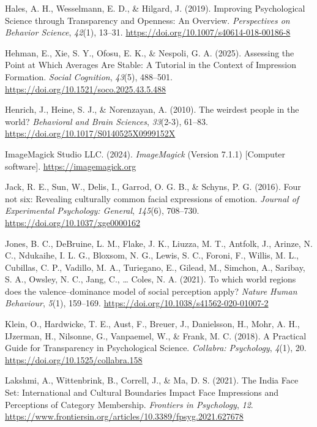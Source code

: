 \documentclass[
  letterpaper,
  DIV=11,
  numbers=noendperiod]{scrartcl}
\newlength{\cslhangindent}
\newenvironment{CSLReferences}[2] %
 {\begin{list}{}{%
  \setlength{\itemindent}{0pt}
  \setlength{\leftmargin}{0pt}
  \setlength{\parsep}{0pt}
  \ifodd #1
   \setlength{\leftmargin}{\cslhangindent}
   \setlength{\itemindent}{-1\cslhangindent}
  \fi
  \setlength{\itemsep}{#2\baselineskip}}}
 {\end{list}}
\begin{document}
\begin{CSLReferences}{1}{0}
Hales, A. H., Wesselmann, E. D., \& Hilgard, J. (2019). Improving
{Psychological} {Science} through {Transparency} and {Openness}: {An}
{Overview}. \emph{Perspectives on Behavior Science}, \emph{42}(1),
13--31. \url{https://doi.org/10.1007/s40614-018-00186-8}

Hehman, E., Xie, S. Y., Ofosu, E. K., \& Nespoli, G. A. (2025).
Assessing the {Point} at {Which} {Averages} {Are} {Stable}: {A}
{Tutorial} in the {Context} of {Impression} {Formation}. \emph{Social
Cognition}, \emph{43}(5), 488--501.
\url{https://doi.org/10.1521/soco.2025.43.5.488}

Henrich, J., Heine, S. J., \& Norenzayan, A. (2010). The weirdest people
in the world? \emph{Behavioral and Brain Sciences}, \emph{33}(2-3),
61--83. \url{https://doi.org/10.1017/S0140525X0999152X}

ImageMagick Studio LLC. (2024). \emph{ImageMagick} (Version 7.1.1)
{[}Computer software{]}. \url{https://imagemagick.org}

Jack, R. E., Sun, W., Delis, I., Garrod, O. G. B., \& Schyns, P. G.
(2016). Four not six: {Revealing} culturally common facial expressions
of emotion. \emph{Journal of Experimental Psychology: General},
\emph{145}(6), 708--730. \url{https://doi.org/10.1037/xge0000162}

Jones, B. C., DeBruine, L. M., Flake, J. K., Liuzza, M. T., Antfolk, J.,
Arinze, N. C., Ndukaihe, I. L. G., Bloxsom, N. G., Lewis, S. C., Foroni,
F., Willis, M. L., Cubillas, C. P., Vadillo, M. A., Turiegano, E.,
Gilead, M., Simchon, A., Saribay, S. A., Owsley, N. C., Jang, C.,
\ldots{} Coles, N. A. (2021). To which world regions does the
valence--dominance model of social perception apply? \emph{Nature Human
Behaviour}, \emph{5}(1), 159--169.
\url{https://doi.org/10.1038/s41562-020-01007-2}

Klein, O., Hardwicke, T. E., Aust, F., Breuer, J., Danielsson, H., Mohr,
A. H., IJzerman, H., Nilsonne, G., Vanpaemel, W., \& Frank, M. C.
(2018). A {Practical} {Guide} for {Transparency} in {Psychological}
{Science}. \emph{Collabra: Psychology}, \emph{4}(1), 20.
\url{https://doi.org/10.1525/collabra.158}

Lakshmi, A., Wittenbrink, B., Correll, J., \& Ma, D. S. (2021). The
{India} {Face} {Set}: {International} and {Cultural} {Boundaries}
{Impact} {Face} {Impressions} and {Perceptions} of {Category}
{Membership}. \emph{Frontiers in Psychology}, \emph{12}.
\url{https://www.frontiersin.org/articles/10.3389/fpsyg.2021.627678}


\end{CSLReferences}
\end{document}
